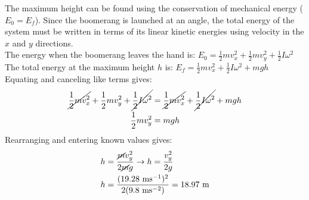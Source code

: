 \documentclass[a4paper]{article}
\newcommand\m{\text{ m}}
\newcommand\ms{\text{ ms}^{-1}}
\newcommand\mss{\text{ ms}^{-2}}
\begin{document}
\begin{shaded}
\begin{enumerate}
        The maximum height can be found using the conservation of mechanical energy ($E_0 = E_f$). Since the boomerang is launched at an angle, the total energy of the system must be written in terms of its linear kinetic energies using velocity in the $x$ and $y$ directions.\\
        The energy when the boomerang leaves the hand is: $\displaystyle E_0 = \frac{1}{2}mv_x^2 + \frac{1}{2}mv_y^2 + \frac{1}{2}I\omega^2$\\
        The total energy at the maximum height $h$ is: $\displaystyle E_f = \frac{1}{2}mv_x^2 + \frac{1}{2}I\omega^2 + mgh$\\
        Equating and canceling like terms gives:
        \begin{align*}
            \cancel{\frac{1}{2}mv_x^2} + \frac{1}{2}mv_y^2 + \cancel{\frac{1}{2}I\omega^2} &= \cancel{\frac{1}{2}mv_x^2} + \cancel{\frac{1}{2}I\omega^2} + mgh\\
            \frac{1}{2}mv_y^2 &= mgh
        \end{align*}
        Rearranging and entering known values gives:
        \begin{align*}
            h &= \frac{\cancel{m}v_y^2}{2\cancel{m}g} \to h = \frac{v_y^2}{2g}\\
            h &= \frac{(19.28\ms)^2}{2(9.8\mss)} = 18.97\m
        \end{align*}
    \end{enumerate} 
\end{shaded}
\newpage
\end{document}
